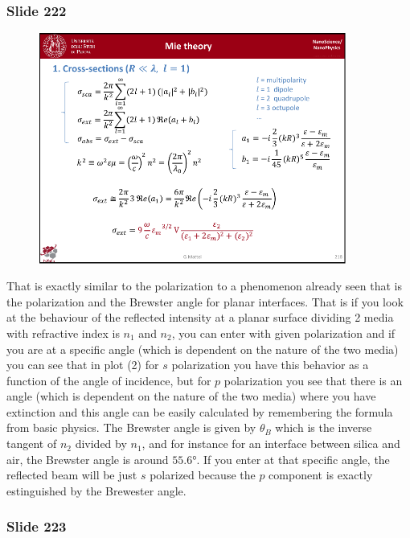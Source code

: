 \documentclass[../main/main.tex]{subfiles}
\begin{document}
\newpage

\subsubsection{Slide 222}

\begin{figure}[h!]
\centering
\includegraphics[page=5,width=0.9\textwidth]{../lessons/pdf_file/14_lesson.pdf}
\end{figure}

That is exactly similar to the polarization to a phenomenon already seen that is the polarization and the Brewster angle for planar interfaces. That is
if you look at the behaviour of the reflected intensity at a planar surface dividing 2 media with refractive index is $n_1$ and $n_2$, you can enter with given polarization and if you are at a specific angle (which is dependent on the nature of the two media) you can see that in plot (2) for \( s \) polarization you have this behavior as a function of the angle of incidence, but for \( p \) polarization you see that there is an angle (which is dependent on the nature of the two media) where you have extinction and this angle can be easily calculated by remembering the formula from basic physics. The Brewster angle is given by \( \theta _B \) which is the inverse tangent of \( n_2 \) divided by \( n_1 \), and for instance for an interface between silica and air, the Brewster angle is around \( 55.6° \). If you enter at that specific angle, the reflected beam will be just \( s \) polarized because the \( p \)
component is exactly estinguished by the Brewester angle.


\newpage

\subsubsection{Slide 223}
\end{document}
